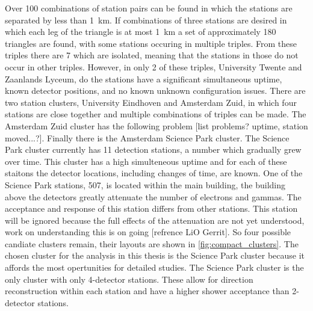 Over \num{100} combinations of \hisparc station pairs can be found in which the stations are separated by less than \SI{1}{\kilo\meter}. If combinations of three stations are desired in which each leg of the triangle is at most \SI{1}{\kilo\meter} a set of approximately \num{180} triangles are found, with some stations occuring in multiple triples. From these triples there are \num{7} which are isolated, meaning that the stations in those do not occur in other triples. However, in only \num{2} of these triples, University Twente and Zaanlands Lyceum, do the stations have a significant simultaneous uptime, known detector positions, and no known unknown configuration issues. There are two station clusters, University Eindhoven and Amsterdam Zuid, in which four stations are close together and multiple combinations of triples can be made. The Amsterdam Zuid cluster has the following problem [list problems? uptime, station moved...?]. Finally there is the Amsterdam Science Park cluster. The Science Park cluster currently has \num{11} detection stations, a number which gradually grew over time. This cluster has a high simulteneous uptime and for each of these staitons the detector locations, including changes of time, are known. One of the Science Park stations, 507, is located within the main \nikhef building, the building above the detectors greatly attenuate the number of electrons and gammas. The acceptance and response of this station differs from other stations. This station will be ignored because the full effects of the attenuation are not yet understood, work on understanding this is on going [refrence LiO Gerrit]. So four possible candiate clusters remain, their layouts are shown in \ref{fig:compact_clusters}. The chosen cluster for the analysis in this thesis is the Science Park cluster because it affords the most opertunities for detailed studies. The Science Park cluster is the only cluster with only 4-detector stations. These allow for direction reconstruction within each station and have a higher shower acceptance than 2-detector stations.


